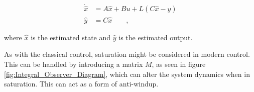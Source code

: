 \documentclass[../../main.tex]{subfiles}
\begin{document}
\begin{equation}\label{eq:Obs_state_space}
    \begin{split}
        \Dot{\hat{x}}&=A\hat{x}+Bu+L(C\hat{x}-y)\\
        \hat{y}&=C\hat{x} \qquad ,
    \end{split}
\end{equation}

where $\hat{x}$ is the estimated state and $\hat{y}$ is the estimated output.

As with the classical control, saturation might be considered in modern control. This can be handled by introducing a matrix $M$, as seen in figure \ref{fig:Integral_Observer_Diagram}, which can alter the system dynamics when in saturation. This can act as a form of anti-windup.


\end{document}
